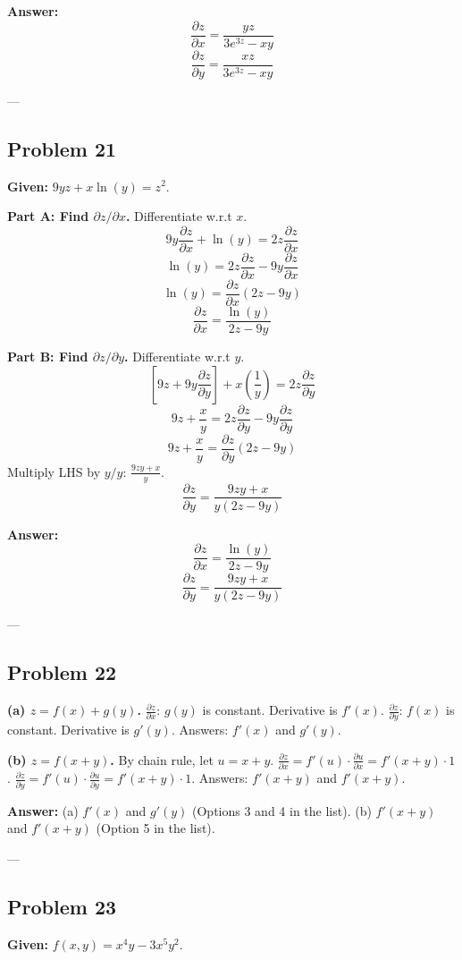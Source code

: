 \documentclass{article}
\begin{document}
\textbf{Answer:}
\[ \frac{\partial z}{\partial x} = \frac{yz}{3e^{3z} - xy} \]
\[ \frac{\partial z}{\partial y} = \frac{xz}{3e^{3z} - xy} \]

---

\subsection*{Problem 21}
\textbf{Given:} $9yz + x \ln(y) = z^2$.

\textbf{Part A: Find $\partial z / \partial x$.}
Differentiate w.r.t $x$.
\[ 9y \frac{\partial z}{\partial x} + \ln(y) = 2z \frac{\partial z}{\partial x} \]
\[ \ln(y) = 2z \frac{\partial z}{\partial x} - 9y \frac{\partial z}{\partial x} \]
\[ \ln(y) = \frac{\partial z}{\partial x} (2z - 9y) \]
\[ \frac{\partial z}{\partial x} = \frac{\ln(y)}{2z - 9y} \]

\textbf{Part B: Find $\partial z / \partial y$.}
Differentiate w.r.t $y$.
\[ [9z + 9y \frac{\partial z}{\partial y}] + x(\frac{1}{y}) = 2z \frac{\partial z}{\partial y} \]
\[ 9z + \frac{x}{y} = 2z \frac{\partial z}{\partial y} - 9y \frac{\partial z}{\partial y} \]
\[ 9z + \frac{x}{y} = \frac{\partial z}{\partial y} (2z - 9y) \]
Multiply LHS by $y/y$: $\frac{9zy + x}{y}$.
\[ \frac{\partial z}{\partial y} = \frac{9zy + x}{y(2z - 9y)} \]

\textbf{Answer:}
\[ \frac{\partial z}{\partial x} = \frac{\ln(y)}{2z - 9y} \]
\[ \frac{\partial z}{\partial y} = \frac{9zy + x}{y(2z - 9y)} \]

---

\subsection*{Problem 22}
\textbf{(a) $z = f(x) + g(y)$.}
$\frac{\partial z}{\partial x}$: $g(y)$ is constant. Derivative is $f'(x)$.
$\frac{\partial z}{\partial y}$: $f(x)$ is constant. Derivative is $g'(y)$.
Answers: $f'(x)$ and $g'(y)$.

\textbf{(b) $z = f(x+y)$.}
By chain rule, let $u = x+y$.
$\frac{\partial z}{\partial x} = f'(u) \cdot \frac{\partial u}{\partial x} = f'(x+y) \cdot 1$.
$\frac{\partial z}{\partial y} = f'(u) \cdot \frac{\partial u}{\partial y} = f'(x+y) \cdot 1$.
Answers: $f'(x+y)$ and $f'(x+y)$.

\textbf{Answer:}
(a) $f'(x)$ and $g'(y)$ (Options 3 and 4 in the list).
(b) $f'(x+y)$ and $f'(x+y)$ (Option 5 in the list).

---

\subsection*{Problem 23}
\textbf{Given:} $f(x, y) = x^4 y - 3x^5 y^2$.
\end{document}
